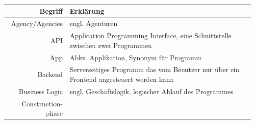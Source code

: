\documentclass[a4paper,10pt,xetex]{article}
\begin{document}
\begin{longtable}[]{@{}rl@{}}
\toprule
\begin{minipage}[b]{0.18\columnwidth}\raggedleft\strut
\textbf{Begriff}\strut
\end{minipage} & \begin{minipage}[b]{0.76\columnwidth}\raggedright\strut
\textbf{Erklärung}\strut
\end{minipage}\tabularnewline
\midrule
\endhead
\begin{minipage}[t]{0.18\columnwidth}\raggedleft\strut
Agency/Agencies\strut
\end{minipage} & \begin{minipage}[t]{0.76\columnwidth}\raggedright\strut
engl. Agenturen\strut
\end{minipage}\tabularnewline
\begin{minipage}[t]{0.18\columnwidth}\raggedleft\strut
API\strut
\end{minipage} & \begin{minipage}[t]{0.76\columnwidth}\raggedright\strut
Application Programming Interface, eine Schnittstelle zwischen zwei
Programmen\strut
\end{minipage}\tabularnewline
\begin{minipage}[t]{0.18\columnwidth}\raggedleft\strut
App\strut
\end{minipage} & \begin{minipage}[t]{0.76\columnwidth}\raggedright\strut
Abkz. Applikation, Synonym für Programm\strut
\end{minipage}\tabularnewline
\begin{minipage}[t]{0.18\columnwidth}\raggedleft\strut
Backend\strut
\end{minipage} & \begin{minipage}[t]{0.76\columnwidth}\raggedright\strut
Serverseitiges Programm das vom Benutzer nur über ein Frontend
angesteuert werden kann\strut
\end{minipage}\tabularnewline
\begin{minipage}[t]{0.18\columnwidth}\raggedleft\strut
Business Logic\strut
\end{minipage} & \begin{minipage}[t]{0.76\columnwidth}\raggedright\strut
engl. Geschäftslogik, logischer Ablauf des Programmes\strut
\end{minipage}\tabularnewline
\begin{minipage}[t]{0.18\columnwidth}\raggedleft\strut
Construction-phase\strut
\end{minipage} & \begin{minipage}[t]{0.76\columnwidth}\raggedright\strut

\end{minipage}
\end{longtable}
\end{document}
